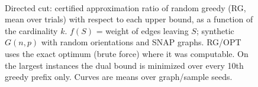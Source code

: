 \begin{figure}[t]
\centering
\setlength{\rgplotwidth}{0.245\textwidth}
\\[1pt]
\hfill
\hfill
\hfill

\caption{Directed cut: certified approximation ratio of random greedy (RG, mean over trials) with respect to each upper bound, as a function of the cardinality $k$. $f(S)$ = weight of edges leaving $S$; synthetic $G(n,p)$ with random orientations and SNAP graphs. RG/OPT uses the exact optimum (brute force) where it was computable. On the largest instances the dual bound is minimized over every 10th greedy prefix only. Curves are means over graph/sample seeds.}
\label{fig:rg-directed_cut-wide}
\end{figure}
